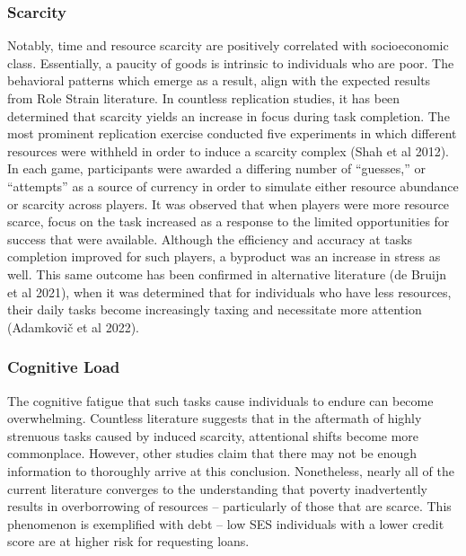 \hypertarget{scarcity}{%
\subsubsection{Scarcity}\label{scarcity}}

Notably, time and resource scarcity are positively correlated with
socioeconomic class. Essentially, a paucity of goods is intrinsic to
individuals who are poor. The behavioral patterns which emerge as a
result, align with the expected results from Role Strain literature. In
countless replication studies, it has been determined that scarcity
yields an increase in focus during task completion. The most prominent
replication exercise conducted five experiments in which different
resources were withheld in order to induce a scarcity complex (Shah et
al 2012). In each game, participants were awarded a differing number of
``guesses,'' or ``attempts'' as a source of currency in order to
simulate either resource abundance or scarcity across players. It was
observed that when players were more resource scarce, focus on the task
increased as a response to the limited opportunities for success that
were available. Although the efficiency and accuracy at tasks completion
improved for such players, a byproduct was an increase in stress as
well. This same outcome has been confirmed in alternative literature (de
Bruijn et al 2021), when it was determined that for individuals who have
less resources, their daily tasks become increasingly taxing and
necessitate more attention (Adamkovič et al 2022).

\hypertarget{cognitive-load}{%
\subsubsection{Cognitive Load}\label{cognitive-load}}

The cognitive fatigue that such tasks cause individuals to endure can
become overwhelming. Countless literature suggests that in the aftermath
of highly strenuous tasks caused by induced scarcity, attentional shifts
become more commonplace. However, other studies claim that there may not
be enough information to thoroughly arrive at this conclusion.
Nonetheless, nearly all of the current literature converges to the
understanding that poverty inadvertently results in overborrowing of
resources -- particularly of those that are scarce. This phenomenon is
exemplified with debt -- low SES individuals with a lower credit score
are at higher risk for requesting loans.

